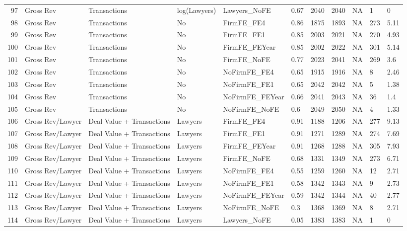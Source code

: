 \documentclass{article}
\begin{document}
\begin{table}[H]
\begin{tabular}{rllllllllll}
  97 & Gross Rev & Transactions & log(Lawyers) & Lawyers\_NoFE & 0.67 & 2040 & 2040 & NA & 1 & 0 \\
  98 & Gross Rev & Transactions & No & FirmFE\_FE4 & 0.86 & 1875 & 1893 & NA & 273 & 5.11 \\
  99 & Gross Rev & Transactions & No & FirmFE\_FE1 & 0.85 & 2003 & 2021 & NA & 270 & 4.93 \\
  100 & Gross Rev & Transactions & No & FirmFE\_FEYear & 0.85 & 2002 & 2022 & NA & 301 & 5.14 \\
  101 & Gross Rev & Transactions & No & FirmFE\_NoFE & 0.77 & 2023 & 2041 & NA & 269 & 3.6 \\
  102 & Gross Rev & Transactions & No & NoFirmFE\_FE4 & 0.65 & 1915 & 1916 & NA & 8 & 2.46 \\
  103 & Gross Rev & Transactions & No & NoFirmFE\_FE1 & 0.65 & 2042 & 2042 & NA & 5 & 1.38 \\
  104 & Gross Rev & Transactions & No & NoFirmFE\_FEYear & 0.66 & 2041 & 2043 & NA & 36 & 1.4 \\
  105 & Gross Rev & Transactions & No & NoFirmFE\_NoFE & 0.6 & 2049 & 2050 & NA & 4 & 1.33 \\
  106 & Gross Rev/Lawyer & Deal Value + Transactions & Lawyers & FirmFE\_FE4 & 0.91 & 1188 & 1206 & NA & 277 & 9.13 \\
  107 & Gross Rev/Lawyer & Deal Value + Transactions & Lawyers & FirmFE\_FE1 & 0.91 & 1271 & 1289 & NA & 274 & 7.69 \\
  108 & Gross Rev/Lawyer & Deal Value + Transactions & Lawyers & FirmFE\_FEYear & 0.91 & 1268 & 1288 & NA & 305 & 7.93 \\
  109 & Gross Rev/Lawyer & Deal Value + Transactions & Lawyers & FirmFE\_NoFE & 0.68 & 1331 & 1349 & NA & 273 & 6.71 \\
  110 & Gross Rev/Lawyer & Deal Value + Transactions & Lawyers & NoFirmFE\_FE4 & 0.55 & 1259 & 1260 & NA & 12 & 2.71 \\
  111 & Gross Rev/Lawyer & Deal Value + Transactions & Lawyers & NoFirmFE\_FE1 & 0.58 & 1342 & 1343 & NA & 9 & 2.73 \\
  112 & Gross Rev/Lawyer & Deal Value + Transactions & Lawyers & NoFirmFE\_FEYear & 0.59 & 1342 & 1344 & NA & 40 & 2.77 \\
  113 & Gross Rev/Lawyer & Deal Value + Transactions & Lawyers & NoFirmFE\_NoFE & 0.3 & 1368 & 1369 & NA & 8 & 2.71 \\
  114 & Gross Rev/Lawyer & Deal Value + Transactions & Lawyers & Lawyers\_NoFE & 0.05 & 1383 & 1383 & NA & 1 & 0 \\

\end{tabular}
\end{table}
\end{document}
